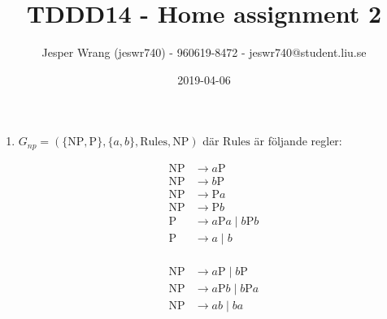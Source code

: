 \documentclass{article}
\title{TDDD14 - Home assignment 2}
\author{Jesper Wrang (jeswr740) - 960619-8472 - jeswr740@student.liu.se}
\date{2019-04-06}
\begin{document}
\maketitle

\section{}

\begin{enumerate}[label=(\alph*)]
    \item 
$G_{np} = (\{\text{NP}, \text{P}\}, \{a, b\}, \text{Rules}, \text{NP})$ där $\text{Rules}$ är följande regler: 


\begin{align*}
\text{NP} & \to a\text{P} \\
\text{NP} & \to b\text{P} \\
\text{NP} & \to \text{P}a \\
\text{NP} & \to \text{P}b \\
\text{P} & \to a\text{P}a \; |\; b\text{P}b \\
\text{P} & \to a \; |\; b \\
\end{align*}

\begin{align*}
\text{NP} & \to a\text{P} \; |\; b\text{P} \\
\text{NP} & \to a\text{P}b \; |\; b\text{P}a \\
\text{NP} & \to ab \; |\; ba \\
\end{align*}


\end{enumerate}
\end{document}
